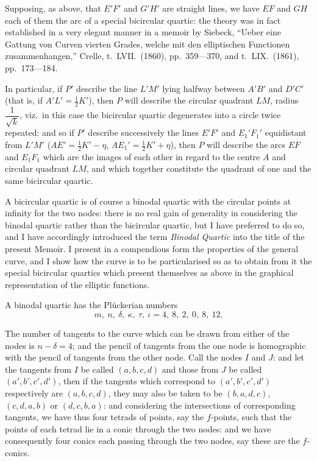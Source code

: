 \documentclass[11pt,a4paper]{book}
\begin{document}
Supposing, as above, that $E'F'$ and $G'H'$ are straight lines, we have $EF$ and $GH$ each of them the arc of a special bicircular quartic: the theory was in fact established in a very elegant manner in a memoir by Siebeck, ``Ueber eine Gattung von Curven vierten Grades, welche mit den elliptischen Functionen zusammenhangen,'' Crelle, t.\ LVII.\ (1860), pp.\ 359---370, and t.\ LIX.\ (1861), pp.\ 173---184.

In particular, if $P'$ describe the line $L'M'$ lying halfway between $A'B'$ and $D'C'$ (that is, if $A'L' = \tfrac{1}{2}K'$), then $P$ will describe the circular quadrant $LM$, radius $\dfrac{1}{\sqrt{k}}$, viz.\ in this case the bicircular quartic degenerates into a circle twice repeated: and so if $P'$ describe successively the lines $E'F'$ and $E_1'F_1'$ equidistant from $L'M'$ ($AE' = \tfrac{1}{2}K' - \eta$, $AE_1' = \tfrac{1}{2}K' + \eta$), then $P$ will describe the arcs $EF$ and $E_1F_1$ which are the images of each other in regard to the centre $A$ and circular quadrant $LM$, and which together constitute the quadrant of one and the same bicircular quartic.

A bicircular quartic is of course a binodal quartic with the circular points at infinity for the two nodes: there is no real gain of generality in considering the binodal quartic rather than the bicircular quartic, but I have preferred to do so, and I have accordingly introduced the term \emph{Binodal Quartic} into the title of the present Memoir. I present in a compendious form the properties of the general curve, and I show how the curve is to be particularised so as to obtain from it the special bicircular quartics which present themselves as above in the graphical representation of the elliptic functions.

A binodal quartic has the Pl\"uckerian numbers
\[
m,\ n,\ \delta,\ \kappa,\ \tau,\ \iota = 4,\ 8,\ 2,\ 0,\ 8,\ 12.
\]

The number of tangents to the curve which can be drawn from either of the nodes is $n - \delta = 4$; and the pencil of tangents from the one node is homographic with the pencil of tangents from the other node. Call the nodes $I$ and $J$: and let the tangents from $I$ be called $(a, b, c, d)$ and those from $J$ be called $(a', b', c', d')$, then if the tangents which correspond to $(a', b', c', d')$ respectively are $(a, b, c, d)$, they may also be taken to be $(b, a, d, c)$, $(c, d, a, b)$ or $(d, c, b, a)$: and considering the intersections of corresponding tangents, we have thus four tetrads of points, say the $f$-points, such that the points of each tetrad lie in a conic through the two nodes: and we have consequently four conics each passing through the two nodes, say these are the $f$-conics.
\end{document}
